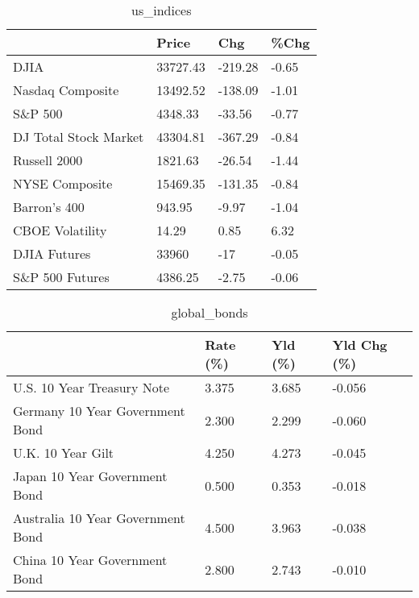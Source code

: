 \documentclass{article}%
\begin{document}
%


\begin{table}[htbp]%
\caption{us\_indices}%
\centering%
\begin{adjustbox}{width=1\textwidth}%
\begin{tabular}{llll}
\toprule
                      &    Price &     Chg &  \%Chg \\
\midrule
                 DJIA & 33727.43 & -219.28 & -0.65 \\
     Nasdaq Composite & 13492.52 & -138.09 & -1.01 \\
              S\&P 500 &  4348.33 &  -33.56 & -0.77 \\
DJ Total Stock Market & 43304.81 & -367.29 & -0.84 \\
         Russell 2000 &  1821.63 &  -26.54 & -1.44 \\
       NYSE Composite & 15469.35 & -131.35 & -0.84 \\
         Barron's 400 &   943.95 &   -9.97 & -1.04 \\
      CBOE Volatility &    14.29 &    0.85 &  6.32 \\
         DJIA Futures &    33960 &     -17 & -0.05 \\
      S\&P 500 Futures &  4386.25 &   -2.75 & -0.06 \\
\bottomrule
\end{tabular}
%
\end{adjustbox}%
\end{table}

%


\begin{table}[htbp]%
\caption{global\_bonds}%
\centering%
\begin{adjustbox}{width=1\textwidth}%
\begin{tabular}{llll}
\toprule
                                  & Rate (\%) & Yld (\%) & Yld Chg (\%) \\
\midrule
       U.S. 10 Year Treasury Note &    3.375 &   3.685 &      -0.056 \\
  Germany 10 Year Government Bond &    2.300 &   2.299 &      -0.060 \\
                U.K. 10 Year Gilt &    4.250 &   4.273 &      -0.045 \\
    Japan 10 Year Government Bond &    0.500 &   0.353 &      -0.018 \\
Australia 10 Year Government Bond &    4.500 &   3.963 &      -0.038 \\
    China 10 Year Government Bond &    2.800 &   2.743 &      -0.010 \\
\bottomrule
\end{tabular}
%
\end{adjustbox}%
\end{table}
\end{document}
